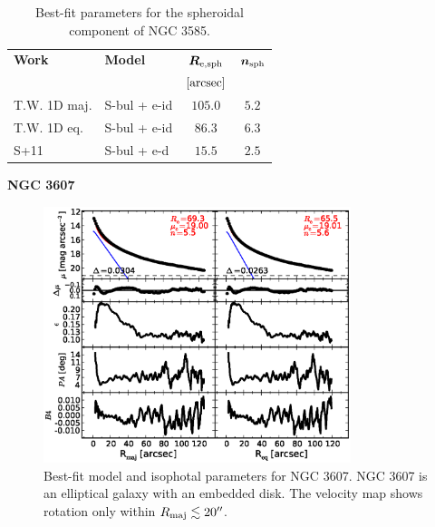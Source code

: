 \documentclass[preprint2]{emulateapj}
\newcommand{\fitfigurewidth}{0.8\textwidth}
\begin{document}
  \begin{table}[h]
  \small
  \caption{Best-fit parameters for the spheroidal component of NGC 3585.}
  \begin{center}
  \begin{tabular}{llcc}
  \hline
  {\bf Work} & {\bf Model}   & $\bm R_{\rm e,sph}$    & $\bm n_{\rm sph}$ \\
    &  &  $[\rm arcsec]$ & \\
  \hline
  T.W. 1D maj. & S-bul + e-id & $105.0$  &  $5.2$ \\
  T.W. 1D eq.  & S-bul + e-id & $86.3$  &  $6.3$ \\
  \hline
  S+11         & S-bul + e-d      & $15.5$   &  $2.5$ \\
  \hline
  \end{tabular}
  \end{center}
  \label{tab:n3585}
  \end{table}


  \clearpage\newpage\noindent

  {\bf NGC 3607 \\}

  \begin{figure}[h]
  \begin{center}
  \includegraphics[width=\fitfigurewidth]{images/n3607_1Dfit.eps}
  \caption{Best-fit model and isophotal parameters for NGC 3607. 
  NGC 3607 is an elliptical galaxy with an embedded disk. 
  The velocity map shows rotation only within $R_{\rm maj} \lesssim 20''$. 
   }
  \end{center}
  \end{figure}
  
\end{document}
